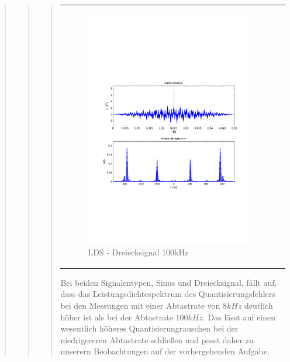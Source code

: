 \begin{quote}
\begin{quote}
\begin{quote}
\begin{center}
\begin{tabular}{ll}
                \begin{minipage}{0.6\textwidth}
                    \begin{figure}[H]
                        \includegraphics[scale=0.4, trim = 1.5cm 7cm 1.5cm 8cm, clip]
                        {./Bilder/drei100_Quantisierungsfehler_LDS}
                          \caption{LDS - Dreiecksignal 100kHz}
                    \end{figure}
                \end{minipage}
            
            \end{tabular}
        \end{center}
        \vspace{1em}
			
		Bei beiden Signalentypen, Sinus und Dreiecksignal, fällt auf, dass das Leistungsdichtespektrum des
		Quantisierungsfehlers bei den Messungen mit einer Abtastrate von $8 kHz$ deutlich höher ist als bei der Abtastrate
		$100 kHz$. Das lässt auf einen wesentlich höheres Quantisierungrauschen bei der niedrigereren Abtastrate schließen und
		passt daher zu unserern Beobachtungen auf der vorhergehenden Aufgabe.
			
		\end{quote} %
    \end{quote}  %
         	
\end{quote}%

